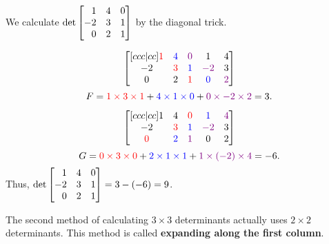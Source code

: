 \begin{example}
	We calculate $\det\mat{1 & 4 & 0 \\ -2 & 3 & 1 \\ 0 & 2 & 1}$ by the diagonal
	trick.

	\[
		\begin{bmatrix}
			[ccc|cc] {\color{red}1} & {\color{blue}4} & {\color{violet}0} & 1                  & 4                 \\
			-2                      & {\color{red}3}  & {\color{blue}1}   & {\color{violet}-2} & 3                 \\
			0                       & 2               & {\color{red}1}    & {\color{blue}0}    & {\color{violet}2}
		\end{bmatrix}
	\]
	\[
		F={\color{red} 1 \times 3 \times 1}+{\color{blue} 4\times 1 \times 0}+{\color{violet}0\times{-2}\times 2}=3.
	\]

	\[
		\begin{bmatrix}
			[ccc|cc] 1     & 4               & {\color{red}0}    & {\color{blue}1}    & {\color{violet}4} \\
			-2             & {\color{red}3}  & {\color{blue}1}   & {\color{violet}-2} & 3                 \\
			{\color{red}0} & {\color{blue}2} & {\color{violet}1} & 0                  & 2
		\end{bmatrix}
	\]
	\[
		G={\color{red}0 \times 3 \times 0}+{\color{blue}2\times 1 \times 1}+{\color{violet} 1 \times (-2)\times 4}=-6.
	\]
	Thus, $\det\mat{1 & 4 & 0 \\ -2 & 3 & 1 \\ 0 & 2 & 1}=3-(-6)=9$.
\end{example}

The second method of calculating $3\times 3$ determinants actually uses $2\times
2$ determinants. This method is called \textbf{expanding along the first column}.

